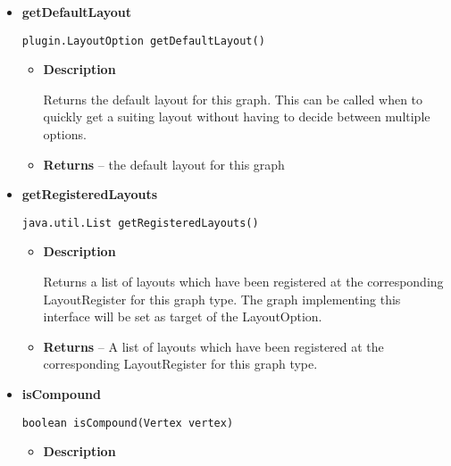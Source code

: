 {{{{{{{{{{{{{{\begin{itemize}
{\begin{itemize}
{Expands a collapsed vertex into its substituted set of vertices The vertices will be added back to the set of vertices of this graph. The compound vertex will be removed from the set of vertices. All to the compound vertex incident edges, will be resolved back into an edge between the vertices it connected before the collapse.
}
\item{
{\bf  Parameters}
  \begin{itemize}
   \item{
\texttt{vertex} -- the collapsed vertex to expand}
  \end{itemize}
}%
\item{{\bf  Returns} -- 
the set of vertices which was substituted by the collapsed vertex 
}%
\end{itemize}
}%
\item{ 
{\bf  getDefaultLayout}\\
\begin{lstlisting}[frame=none]
plugin.LayoutOption getDefaultLayout()\end{lstlisting} %
\begin{itemize}
\item{
{\bf  Description}

Returns the default layout for this graph. This can be called when to quickly get a suiting layout without having to decide between multiple options.
}
\item{{\bf  Returns} -- 
the default layout for this graph 
}%
\end{itemize}
}%
\item{ 
{\bf  getRegisteredLayouts}\\
\begin{lstlisting}[frame=none]
java.util.List getRegisteredLayouts()\end{lstlisting} %
\begin{itemize}
\item{
{\bf  Description}

Returns a list of layouts which have been registered at the corresponding LayoutRegister for this graph type. The graph implementing this interface will be set as target of the LayoutOption.
}
\item{{\bf  Returns} -- 
A list of layouts which have been registered at the corresponding LayoutRegister for this graph type. 
}%
\end{itemize}
}%
\item{ 
{\bf  isCompound}\\
\begin{lstlisting}[frame=none]
boolean isCompound(Vertex vertex)\end{lstlisting} %
\begin{itemize}
\item{
{\bf  Description}

}
\end{itemize}}
\end{itemize}}}}}}}}}}}}}}}
